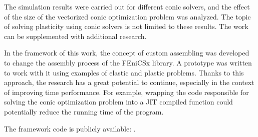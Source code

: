 \documentclass[12pt]{article}
\begin{document}
The simulation results were carried out for different conic solvers, and the effect of the size of the vectorized conic optimization problem was analyzed. The topic of solving plasticity using conic solvers is not limited to these results. The work can be supplemented with additional research.

In the framework of this work, the concept of custom assembling was developed to change the assembly process of the FEniCSx library. A prototype was written to work with it using examples of elastic and plastic problems. Thanks to this approach, the research has a great potential to continue, especially in the context of improving time performance. For example, wrapping the code responsible for solving the conic optimization problem into a JIT compiled function could potentially reduce the running time of the program.

The framework code is publicly available: \parencite{convex-plasticity}.

\newpage
{}
{}
\renewcommand\refname{\centering Bibliography}
\printbibliography
\end{document}
